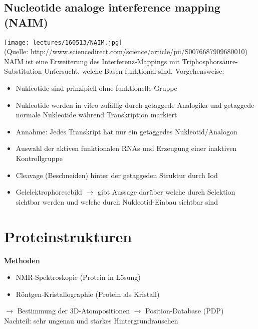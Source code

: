 \subsection{Nucleotide analoge interference mapping (NAIM)}
\texttt{[image: lectures/160513/NAIM.jpg]} \\
(Quelle: http://www.sciencedirect.com/science/article/pii/S0076687909680010) \\
 
NAIM ist eine Erweiterung des Interferenz-Mappings mit Triphosphorsäure-Substitution
Untersucht, welche Basen funktional sind. Vorgehensweise:
\begin{itemize}
\item Nukleotide sind prinzipiell ohne funktionelle Gruppe
\item Nukleotide werden in vitro zufällig durch getaggede Analogika und getaggede normale Nukleotide während Transkription markiert
\item Annahme: Jedes Transkript hat nur ein getaggedes Nukleotid/Analogon
\item Auswahl der aktiven funktionalen RNAs und Erzeugung einer inaktiven Kontrollgruppe
\item Cleavage (Beschneiden) hinter der getaggeden Struktur durch Iod
\item Gelelektrophoresebild $\rightarrow$ gibt Aussage darüber welche durch Selektion sichtbar werden und welche durch Nukleotid-Einbau sichtbar sind
\end{itemize}

\section{Proteinstrukturen}
\textbf{Methoden}
\begin{itemize}
\item NMR-Spektroskopie (Protein in Lösung)
\item Röntgen-Kristallographie (Protein als Kristall)
\end{itemize}
$\rightarrow$ Bestimmung der 3D-Atompositionen $\rightarrow$ Position-Database (PDP)\\

Nachteil: sehr ungenau und starkes Hintergrundrauschen